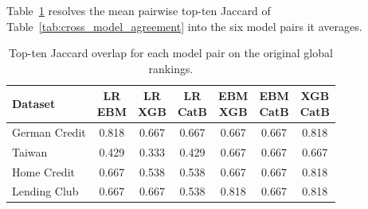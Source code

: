 Table~\ref{tab:pairwise_jaccard} resolves the mean pairwise top-ten Jaccard of
Table~\ref{tab:cross_model_agreement} into the six model pairs it averages.

\begin{table}[htbp]
\centering
\small
\setlength{\tabcolsep}{4pt}
\begin{tabular}{@{}lcccccc@{}}
\toprule
\textbf{Dataset} & \shortstack{LR\\EBM} & \shortstack{LR\\XGB} & \shortstack{LR\\CatB} & \shortstack{EBM\\XGB} & \shortstack{EBM\\CatB} & \shortstack{XGB\\CatB} \\
\midrule
German Credit & 0.818 & 0.667 & 0.667 & 0.667 & 0.667 & 0.818 \\
Taiwan        & 0.429 & 0.333 & 0.429 & 0.667 & 0.667 & 0.667 \\
Home Credit   & 0.667 & 0.538 & 0.538 & 0.667 & 0.667 & 0.818 \\
Lending Club  & 0.667 & 0.667 & 0.538 & 0.818 & 0.667 & 0.818 \\
\bottomrule
\end{tabular}
\caption[Pairwise top-ten Jaccard overlap]{Top-ten Jaccard overlap for each model pair on
  the original global rankings.}
\label{tab:pairwise_jaccard}
\end{table}

\FloatBarrier
